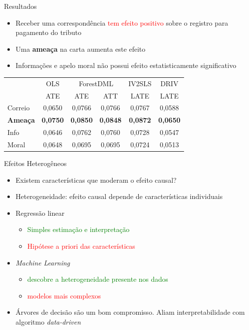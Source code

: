 \documentclass[
  12pt,
  ignorenonframetext,
  aspectratio=169]{beamer}
\providecommand{\tightlist}{%
  \setlength{\itemsep}{0pt}\setlength{\parskip}{0pt}}
\begin{document}
\begin{frame}{Resultados}
\protect\hypertarget{resultados}{}
\begin{itemize}
\tightlist
\item
  Receber uma correspondência \textcolor{red}{tem efeito positivo} sobre
  o registro para pagamento do tributo
\item
  Uma \textbf{ameaça} na carta aumenta este efeito
\item
  Informações e apelo moral não possui efeito estatisticamente
  significativo
\end{itemize}

\begin{table}[H]
\centering
\fontsize{8}{10}\selectfont
\begin{tabular}{lccccc}
\toprule\toprule
 & OLS & \multicolumn{2}{c}{ForestDML} & IV2SLS &   DRIV \\
 &    ATE &   ATE &    ATT &   LATE &   LATE \\
\midrule
Correio & 0,0650  & 0,0766 & 0,0766 & 0,0767 & 0,0588 \\
\textbf{Ameaça}  & \textbf{0,0750}  & \textbf{0,0850} & \textbf{0,0848} & \textbf{0,0872} & \textbf{0,0650} \\
Info    & 0,0646  & 0,0762 & 0,0760 & 0,0728 & 0,0547 \\
Moral   & 0,0648  & 0,0695 & 0,0695 & 0,0724 & 0,0513 \\
\bottomrule\bottomrule
\end{tabular}
\end{table}
\end{frame}

\begin{frame}{Efeitos Heterogêneos}
\protect\hypertarget{efeitos-heteroguxeaneos}{}
\begin{itemize}
\tightlist
\item
  Existem características que moderam o efeito causal?
\item
  Heterogeneidade: efeito causal depende de características individuais
\item
  Regressão linear

  \begin{itemize}
  \tightlist
  \item
    \textcolor{green}{Simples estimação e interpretação}
  \item
    \textcolor{red}{Hipótese a priori das características}
  \end{itemize}
\item
  \emph{Machine Learning}

  \begin{itemize}
  \tightlist
  \item
    \textcolor{green}{descobre a heterogeneidade presente nos dados}
  \item
    \textcolor{red}{modelos mais complexos}
  \end{itemize}
\item
  Árvores de decisão são um bom compromisso. Aliam interpretabilidade
  com algoritmo \emph{data-driven}
\end{itemize}
\end{frame}
\end{document}
